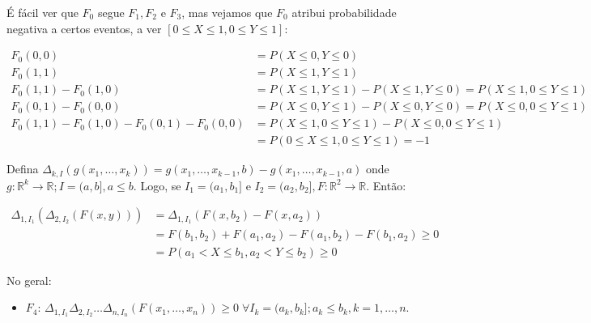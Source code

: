 \documentclass[
]{article}
\providecommand{\tightlist}{%
  \setlength{\itemsep}{0pt}\setlength{\parskip}{0pt}}
\theoremstyle{definition}
\theoremstyle{definition}
\theoremstyle{definition}
\theoremstyle{definition}
\theoremstyle{remark}
\begin{document}
É fácil ver que \(F_{0}\) segue \(F_{1}, F_{2}\) e \(F_{3}\), mas vejamos que \(F_{0}\) atribui probabilidade negativa a certos eventos, a ver \([0 \le X \le 1, 0 \le Y \le 1]\):

\begin{align*}
F_{0}(0,0) &= P(X \le 0, Y \le 0) \\
F_{0}(1,1) &= P(X \le 1, Y \le 1) \\
F_{0}(1,1) - F_{0}(1,0) &= P(X \le 1, Y \le 1) - P(X \le 1, Y \le 0) = P(X \le 1, 0 \le Y \le 1)\\
F_{0}(0,1) - F_{0}(0,0) &= P(X \le 0, Y \le 1) - P(X \le 0, Y \le 0) = P(X \le 0, 0 \le Y \le 1)\\
F_{0}(1,1) - F_{0}(1,0) - F_{0}(0,1) - F_{0}(0,0) &= P(X \le 1, 0 \le Y \le 1) - P(X \le 0, 0 \le Y \le 1) \\
&= P(0 \le X \le 1, 0 \le Y \le 1) = -1
\end{align*}

Defina \(\Delta_{k,I}(g(x_{1},\ldots,x_{k})) = g(x_{1}, \ldots, x_{k-1},b) - g(x_{1}, \ldots, x_{k-1},a)\) onde \(g:\mathbb{R}^{k} \to \mathbb{R}; I = (a,b], a \le b\). Logo, se \(I_{1} = (a_{1},b_{1}]\) e \(I_{2} = (a_{2},b_{2}], F:\mathbb{R}^{2} \to \mathbb{R}\). Então:

\begin{align*}
\Delta_{1,I_{1}}(\Delta_{2,I_{2}}(F(x,y))) &= \Delta_{1,I_{1}}(F(x, b_{2}) - F(x, a_{2})) \\
&= F(b_{1}, b_{2}) + F(a_{1}, a_{2}) - F(a_{1}, b_{2}) - F(b_{1}, a_{2}) \ge 0 \\
&= P(a_{1} < X \le b_{1}, a_{2} < Y \le b_{2}) \ge 0
\end{align*}

No geral:

\begin{itemize}
\tightlist
\item
  \(F_{4}\): \(\Delta_{1,I_{1}}\Delta_{2,I_{2}}\ldots\Delta_{n,I_{n}}(F(x_{1},\ldots,x_{n})) \ge 0 \; \forall I_{k} = (a_{k}, b_{k}]; a_{k} \le b_{k}, k=1,\ldots,n\).
\end{itemize}
\end{document}
